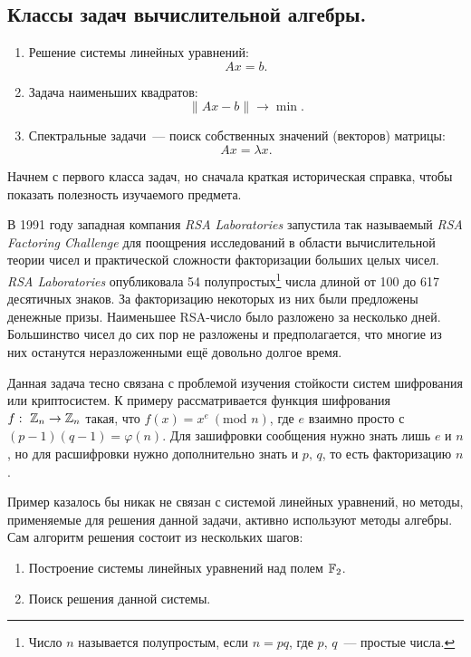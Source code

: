 \newpage
{}

\subsection{Классы задач вычислительной алгебры.}

\begin{enumerate}[label=\protect\circled{\arabic*}]
	\item Решение системы линейных уравнений:
	      \[
		      Ax = b.
	      \]
	\item Задача наименьших квадратов:
	      \[
		      \|Ax-b\|\rightarrow \min.
	      \]
	\item Спектральные задачи~--- поиск собственных значений (векторов) матрицы:
	      \[
		      Ax=\lambda x.
	      \]
\end{enumerate}

Начнем с первого класса задач, но сначала краткая историческая справка, чтобы показать
полезность изучаемого предмета.

\begin{exercise}
	В 1991 году западная компания \textit{RSA Laboratories} запустила так называемый
	\textit{RSA Factoring Challenge} для поощрения исследований в области
	вычислительной теории чисел и практической сложности факторизации больших целых чисел.
	\textit{RSA Laboratories} опубликовала 54 полупростых\footnote[1]{Число $n$ называется полупростым, если $n = pq$, где
		$p,\, q$~--- простые числа.}
	числа длиной от 100 до 617 десятичных знаков.
	За факторизацию некоторых из них были предложены денежные призы. Наименьшее RSA-число было разложено за несколько дней.
	Большинство чисел до сих пор не разложены и предполагается, что многие из них останутся неразложенными
	ещё довольно долгое время.

	Данная задача тесно связана с проблемой изучения стойкости систем шифрования или криптосистем.
	К примеру рассматривается функция шифрования $f:\ \mathbb{Z}_n\rightarrow\mathbb{Z}_n$ такая, что $f(x)=x^e\ (\text{mod } n)$,
	где $e$ взаимно просто с $(p-1)(q-1)=\varphi(n)$. Для зашифровки сообщения нужно знать лишь $e$ и $n$,
	но для расшифровки нужно дополнительно знать и $p,\, q$, то есть факторизацию $n$.
\end{exercise}

Пример казалось бы никак не связан с системой линейных уравнений, но методы, применяемые для
решения данной задачи, активно используют методы алгебры. Сам алгоритм решения состоит из нескольких шагов:
\begin{enumerate}
	\item Построение системы линейных уравнений над полем $\mathbb{F}_2$.
	\item Поиск решения данной системы.
\end{enumerate}

